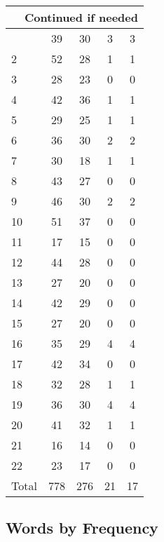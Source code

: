 \begin{center}
\begin{longtable}{l|c|c|c|c}
\hline \multicolumn{5}{|r|}{{Continued if needed}} \\ \hline
\endfoot 
1 & 39 & 30 & 3 & 3\\ \hline
2 & 52 & 28 & 1 & 1\\ \hline
3 & 28 & 23 & 0 & 0\\ \hline
4 & 42 & 36 & 1 & 1\\ \hline
5 & 29 & 25 & 1 & 1\\ \hline
6 & 36 & 30 & 2 & 2\\ \hline
7 & 30 & 18 & 1 & 1\\ \hline
8 & 43 & 27 & 0 & 0\\ \hline
9 & 46 & 30 & 2 & 2\\ \hline
10 & 51 & 37 & 0 & 0\\ \hline
11 & 17 & 15 & 0 & 0\\ \hline
12 & 44 & 28 & 0 & 0\\ \hline
13 & 27 & 20 & 0 & 0\\ \hline
14 & 42 & 29 & 0 & 0\\ \hline
15 & 27 & 20 & 0 & 0\\ \hline
16 & 35 & 29 & 4 & 4\\ \hline
17 & 42 & 34 & 0 & 0\\ \hline
18 & 32 & 28 & 1 & 1\\ \hline
19 & 36 & 30 & 4 & 4\\ \hline
20 & 41 & 32 & 1 & 1\\ \hline
21 & 16 & 14 & 0 & 0\\ \hline
22 & 23 & 17 & 0 & 0\\ \hline
\hline \hline
Total & 778 & 276 & 21 & 17



\end{longtable}
\end{center}

 
\subsection{Words by Frequency}

